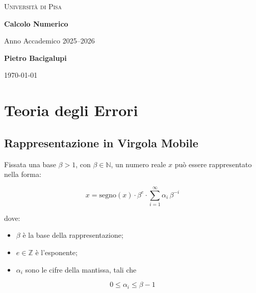 \documentclass[a4paper,12pt]{article}
\begin{document}
	
	\begin{titlepage}
		\centering
		
		{\scshape\LARGE Università di Pisa \par}
		\vspace{0.5cm}
		
		{\Huge\bfseries Calcolo Numerico \par}
		\vspace{0.5cm}
		{\Large Anno Accademico 2025--2026 \par}
		
		\vfill
		
		{\Large\textbf{Pietro Bacigalupi} \par}
		\vspace{0.5cm}
		
		\vfill
		
		{\large \today\par}
		
	\end{titlepage}
	
	\tableofcontents
	\newpage
	
	\section{Teoria degli Errori}
	
	\subsection{Rappresentazione in Virgola Mobile}
	
	Fissata una base $\beta > 1$, con $\beta \in \mathbb{N}$, un numero reale $x$ può essere rappresentato nella forma:
	
	\begin{equation}
		x = \mathrm{segno}(x) \cdot \beta^{e} \cdot \sum_{i=1}^{\infty} \alpha_i \, \beta^{-i}
	\end{equation}
	
	dove:
	
	\begin{itemize}
		\item $\beta$ è la base della rappresentazione;
		\item $e \in \mathbb{Z}$ è l'esponente;
		\item $\alpha_i$ sono le cifre della mantissa, tali che
	\end{itemize}
	
	\begin{equation}
		0 \le \alpha_i \le \beta - 1
	\end{equation}
	
\end{document}
